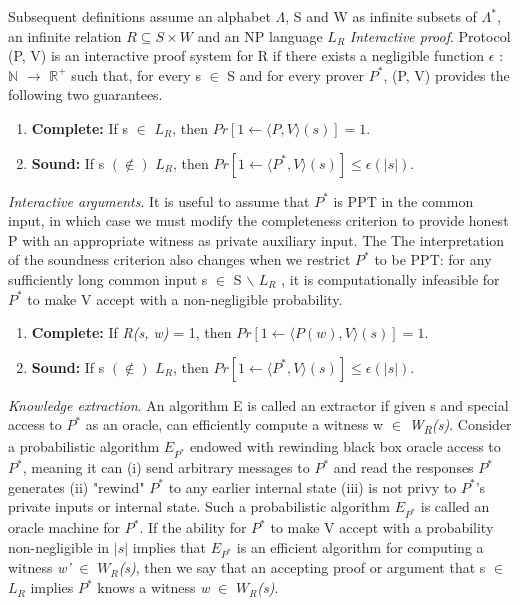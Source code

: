 \documentclass[a4paper]{article}
\begin{document}
\newline
Subsequent definitions assume an alphabet \(\Lambda\), S and W as infinite subsets of \(\Lambda^{*}\), an infinite relation $R \subseteq S \times W$ and an NP language \textit{$L_R$} 
\newline
\newline
\textit{Interactive proof}. Protocol (P, V) is an interactive proof system for R if there exists a negligible function \(\epsilon\) : $\mathbb{N}$ \(\to\) $\mathbb{R}^{+}$ such that, for every s $\in$ S and for every prover \textit{$P^{*}$}, (P, V) provides the following two guarantees.
\begin{enumerate}
  \item \textbf{Complete:}  If s $\in$ \textit{$L_R$}, then $Pr[1 \gets \langle P, V \rangle (s)] = 1$.
  \item \textbf{Sound:}  If s $(\notin)$ \textit{$L_R$}, then $Pr[1 \gets \langle P^{*}, V \rangle (s)] \le \epsilon(|s|)$.
\end{enumerate}
\textit{Interactive arguments}. It is useful to assume that \textit{$P^{*}$} is PPT in the common input, in which case we must modify the completeness criterion to provide honest P with an appropriate witness as private auxiliary input. The The interpretation of the soundness criterion also changes when we restrict \textit{$P^{*}$} to be PPT: for any sufficiently long common input s $\in$ S \ensuremath{\backslash} \textit{$L_R$} , it is computationally infeasible for \textit{$P^{*}$} to make V accept with a non-negligible probability.
\begin{enumerate}
  \item \textbf{Complete:}  If \textit{R(s, w)} = 1, then $Pr[1 \gets \langle P(w), V \rangle (s)] = 1$.
  \item \textbf{Sound:}  If s $(\notin)$ \textit{$L_R$}, then $Pr[1 \gets \langle P^{*}, V \rangle (s)] \le \epsilon(|s|)$.
\end{enumerate}
\textit{Knowledge extraction}. An algorithm E is called an extractor if given s and special access to \textit{$P^{*}$} as an oracle, can efficiently compute a witness w $\in$ \textit{W\textsubscript{R}(s)}. Consider a probabilistic algorithm $E_{P^{*}}$ endowed with rewinding black box oracle access to \textit{$P^{*}$}, meaning it can (i) send arbitrary messages to \textit{$P^{*}$} and read the responses \textit{$P^{*}$} generates  (ii) "rewind" \textit{$P^{*}$} to any earlier internal state (iii) is not privy to \textit{$P^{*}$}’s private inputs or internal state. Such a probabilistic algorithm $E_{P^{*}}$ is called an oracle machine for \textit{$P^{*}$}. If the ability for \textit{$P^{*}$} to make V accept with a probability non-negligible in $|s|$ implies that $E_{P^{*}}$ is an efficient algorithm for computing a witness \textit{w'} $\in$ \textit{$W_R$(s)}, then we say that an accepting proof or argument that s $\in$ \textit{$L_R$} implies \textit{$P^{*}$} knows a witness \textit{w} $\in$ \textit{$W_R$(s)}.
\end{document}
